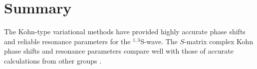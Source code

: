 \documentclass[Dissertation.tex]{subfiles}
\begin{document}
\section{Summary}
\label{sec:SummaryS}

The Kohn-type variational methods have provided highly accurate phase shifts 
and reliable resonance parameters for the $^{1,3}$S-wave. The $S$-matrix
complex Kohn phase shifts and resonance parameters compare well with those
of accurate calculations from other groups \cite{Blackwood2002,Walters2004,Zhang2012}.



\biblio
\end{document}
